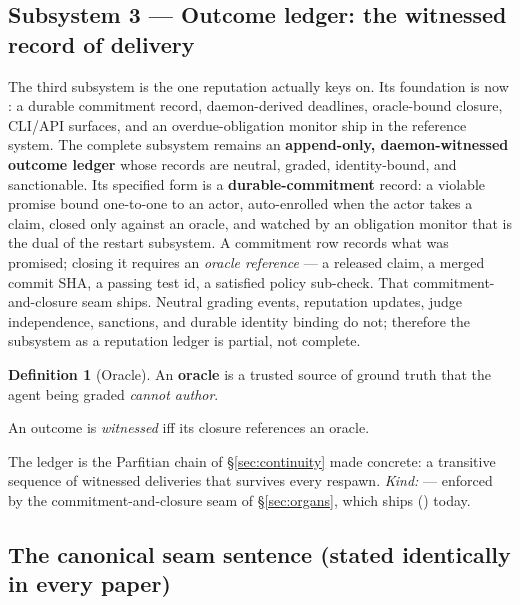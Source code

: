 \documentclass[11pt,a4paper]{article}
\theoremstyle{definition}
\newtheorem{definition}{Definition}[section]
\begin{document}
\subsection{Subsystem 3 --- Outcome ledger: the witnessed record of delivery \quad\BUILTWEAK}

The third subsystem is the one reputation actually keys on. Its foundation is now
\BUILTWEAK: a durable commitment record, daemon-derived deadlines, oracle-bound
closure, CLI/API surfaces, and an overdue-obligation monitor ship in the reference
system. The complete subsystem remains an \textbf{append-only, daemon-witnessed outcome
ledger} whose records are neutral, graded, identity-bound, and sanctionable. Its
specified form is a
\textbf{durable-commitment} record: a violable promise bound one-to-one to an
actor, auto-enrolled when the actor takes a claim, closed only against an oracle,
and watched by an obligation monitor that is the dual of the restart subsystem. A
commitment row records what was promised; closing it requires an
\emph{oracle reference} --- a released claim, a merged commit SHA, a passing test
id, a satisfied policy sub-check. That commitment-and-closure seam ships. Neutral
grading events, reputation updates, judge independence, sanctions, and durable
identity binding do not; therefore the subsystem as a reputation ledger is partial,
not complete.

\begin{definition}[Oracle]\label{def:oracle}
\setlength{\parskip}{4pt plus 1pt}
An \textbf{oracle} is a trusted source of ground truth that the agent being
graded \emph{cannot author}. 

An outcome is \emph{witnessed} iff its closure
references an oracle. 

The ledger is the Parfitian chain of \S\ref{sec:continuity}
made concrete: a transitive sequence of witnessed deliveries that survives every
respawn. \emph{Kind:} \DesignInvariantKind{} --- enforced by the commitment-and-closure
seam of \S\ref{sec:organs}, which ships (\BUILTWEAK) today.
\end{definition}

\subsection{The canonical seam sentence (stated identically in every paper)}

\end{document}
